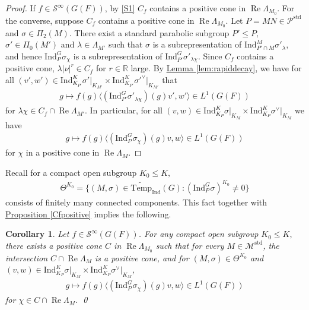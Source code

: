 \documentclass[10pt]{amsart}
\newtheorem{corollary}{Corollary}[theorem]
\theoremstyle{definition}
\numberwithin{equation}{section}
\numberwithin{equation}{subsection}
\newcommand{\Ind}{\mathrm{Ind}}
\newcommand{\RR}{\mathbb{R}}
\newcommand{\Temp}{\mathrm{Temp}}
\renewcommand{\Re}{\mathop{\mathrm{Re}}}
\begin{document}
\begin{proof}
    If $f\in \mathcal{S}^\infty(G(F))$, by \eqref{S1} $C_f$ contains a positive cone in $\Re\Lambda_{M_0}$. For the converse, suppose $C_f$ contains a positive cone in $\Re\Lambda_{M_0}$. Let $P=MN\in \mathcal{P}^{\mathrm{std}}$ and $\sigma\in \Pi_2(M).$ There exist a standard parabolic subgroup $P'\le P,$ $\sigma'\in \Pi_0(M')$ and $\lambda\in \Lambda_{M'}$ such that $\sigma$ is a subrepresentation of $\Ind_{P'\cap M}^{M}\sigma'_\lambda$, and hence $\mathrm{Ind}_{P}^G\sigma_\chi$ is a subrepresentation of $\Ind_{P'}^G\sigma'_{\lambda\chi}.$ Since $C_f$ contains a positive cone, $\lambda|\nu|^r\in C_f$ for $r\in \RR$ large. By \hyperref[lem:rapiddecay]{Lemma \ref{lem:rapiddecay}}, we have for all $(v',w')\in\Ind_{K_{P'} }^K\sigma'\vert_{K_{M'} }\times\Ind_{K_{P'} }^K\sigma'^\vee\vert_{K_{M'}}$ that
    \begin{align*}
    g\mapsto f(g)\langle(\Ind_{P'}^G\sigma'_{\lambda\chi})(g)v',w'\rangle\in L^1(G(F))
    \end{align*} 
    for $\lambda\chi\in C_f\cap \Re\Lambda_{M'}$. In particular, for all $(v,w)\in\Ind_{K_P }^K\sigma\vert_{K_M }\times\Ind_{K_P }^K\sigma^\vee\vert_{K_M}$ we have
    \begin{align*}
    g\mapsto f(g)\langle(\Ind_{P}^G\sigma_{\chi})(g)v,w\rangle\in L^1(G(F))
    \end{align*} 
    for $\chi$ in a positive cone in $\Re \Lambda_M$.
\end{proof}

Recall for a compact open subgroup $K_0\leq K,$
\begin{align*}
    \Theta^{K_0} = \{(M,\sigma)\in\widetilde{\Temp}_\Ind(G): (\Ind_P^G\sigma)^{K_0}\neq 0\}
\end{align*}
consists of finitely many connected components. This fact together with \hyperref[Cfpositive]{Proposition \ref{Cfpositive}} implies the following.

\begin{corollary}\label{cor:Cfpositive}
    Let $f\in \mathcal{S}^\infty(G(F))$. For any compact open subgroup $K_0\leq K,$ there exists a positive cone $C$ in $\Re\Lambda_{M_0}$ such that for every $M\in\mathcal{M}^{\mathrm{std}}$, the intersection $C\cap \Re\Lambda_M$ is a positive cone, and for $(M,\sigma)\in \Theta^{K_0}$ and $(v,w)\in\Ind_{K_P }^K\sigma\vert_{K_M }\times\Ind_{K_P }^K\sigma^\vee\vert_{K_M }$,
\begin{align*}
        g\mapsto f(g)\langle(\Ind_P^G\sigma_\chi)(g)v,w\rangle \in L^1(G(F))
    \end{align*}
for $\chi\in C\cap \Re\Lambda_{M}$. \qed
\end{corollary}
\end{document}
